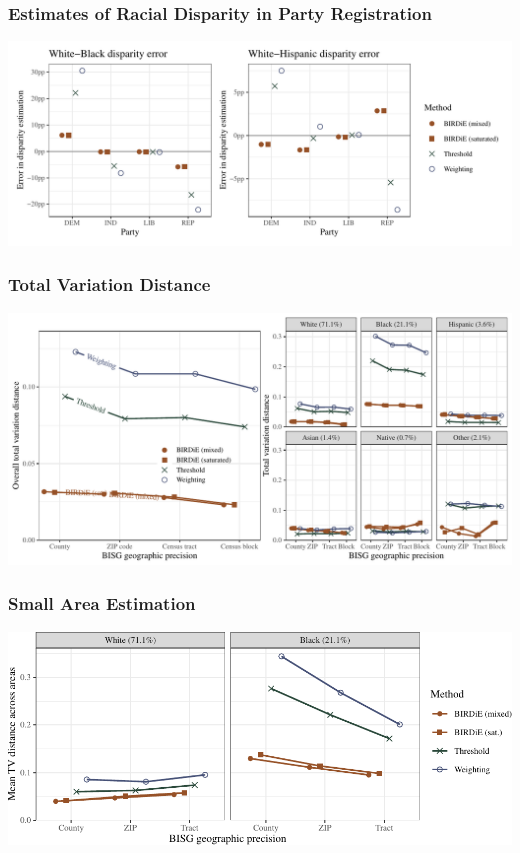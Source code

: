 \documentclass{beamer}
\begin{document}
\begin{frame}

  \frametitle{Estimates of Racial Disparity in Party Registration}

  \includegraphics[width=\textwidth]{../paper/figures/nc_disp.pdf}


\end{frame}


\begin{frame}

  \frametitle{Total Variation Distance}

  \includegraphics[width=\textwidth]{../paper/figures/nc_tv.pdf}

\end{frame}

\begin{frame}

  \frametitle{Small Area Estimation}

 \includegraphics[width=\textwidth]{../paper/figures/nc_smallarea.pdf}


\end{frame}
\end{document}
